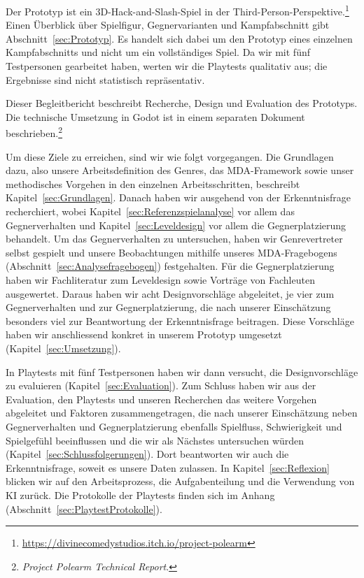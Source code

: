 \documentclass[../Main.tex]{subfiles}
\begin{document}
Der Prototyp ist ein 3D-Hack-and-Slash-Spiel in der Third-Person-Perspektive.\footnote{\url{https://divinecomedystudios.itch.io/project-polearm}} Einen Überblick über Spielfigur, Gegnervarianten und Kampfabschnitt gibt Abschnitt~\ref{sec:Prototyp}. Es handelt sich dabei um den Prototyp eines einzelnen Kampfabschnitts und nicht um ein vollständiges Spiel. Da wir mit fünf Testpersonen gearbeitet haben, werten wir die Playtests qualitativ aus; die Ergebnisse sind nicht statistisch repräsentativ.

Dieser Begleitbericht beschreibt Recherche, Design und Evaluation des Prototyps. Die technische Umsetzung in Godot ist in einem separaten Dokument beschrieben.\footnote{\textit{Project Polearm Technical Report}.}

Um diese Ziele zu erreichen, sind wir wie folgt vorgegangen. Die Grundlagen dazu, also unsere Arbeitsdefinition des Genres, das MDA-Framework sowie unser methodisches Vorgehen in den einzelnen Arbeitsschritten, beschreibt Kapitel~\ref{sec:Grundlagen}. Danach haben wir ausgehend von der Erkenntnisfrage recherchiert, wobei Kapitel~\ref{sec:Referenzspielanalyse} vor allem das Gegnerverhalten und Kapitel~\ref{sec:Leveldesign} vor allem die Gegnerplatzierung behandelt. Um das Gegnerverhalten zu untersuchen, haben wir Genrevertreter selbst gespielt und unsere Beobachtungen mithilfe unseres MDA-Fragebogens (Abschnitt~\ref{sec:Analysefragebogen}) festgehalten. Für die Gegnerplatzierung haben wir Fachliteratur zum Leveldesign\autocite{totten2014architectural,rogers2014levelup} sowie Vorträge von Fachleuten\autocite{gdc_tenprinciples2010,gdc_leveldesignaday2020,gdc_movingmountains2020,gdc_horizonquests2018} ausgewertet. Daraus haben wir acht Designvorschläge abgeleitet, je vier zum Gegnerverhalten und zur Gegnerplatzierung, die nach unserer Einschätzung besonders viel zur Beantwortung der Erkenntnisfrage beitragen. Diese Vorschläge haben wir anschliessend konkret in unserem Prototyp umgesetzt (Kapitel~\ref{sec:Umsetzung}).

In Playtests mit fünf Testpersonen haben wir dann versucht, die Designvorschläge zu evaluieren (Kapitel~\ref{sec:Evaluation}). Zum Schluss haben wir aus der Evaluation, den Playtests und unseren Recherchen das weitere Vorgehen abgeleitet und Faktoren zusammengetragen, die nach unserer Einschätzung neben Gegnerverhalten und Gegnerplatzierung ebenfalls Spielfluss, Schwierigkeit und Spielgefühl beeinflussen und die wir als Nächstes untersuchen würden (Kapitel~\ref{sec:Schlussfolgerungen}). Dort beantworten wir auch die Erkenntnisfrage, soweit es unsere Daten zulassen. In Kapitel~\ref{sec:Reflexion} blicken wir auf den Arbeitsprozess, die Aufgabenteilung und die Verwendung von KI zurück. Die Protokolle der Playtests finden sich im Anhang (Abschnitt~\ref{sec:PlaytestProtokolle}).

\newpage
\end{document}

